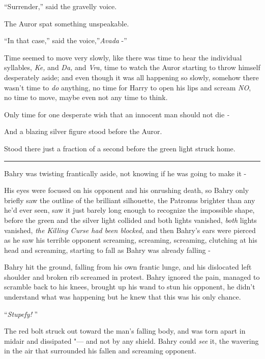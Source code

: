 ``Surrender,'' said the gravelly voice.

The Auror spat something unspeakable.

``In that case,'' said the voice,''\emph{Avada} -''

Time seemed to move very slowly, like there was time to hear the
individual syllables, \emph{Ke,} and \emph{Da,} and \emph{Vra,} time to
watch the Auror starting to throw himself desperately aside; and even
though it was all happening so slowly, somehow there wasn't time to
\emph{do} anything, no time for Harry to open his lips and scream
\emph{NO}, no time to move, maybe even not any time to think.

Only time for one desperate wish that an innocent man should not die
\emph{-}

And a blazing silver figure stood before the Auror.

Stood there just a fraction of a second before the green light struck
home.

\begin{center}\rule{3in}{0.4pt}\end{center}

Bahry was twisting frantically aside, not knowing if he was going to
make it -

His eyes were focused on his opponent and his onrushing death, so Bahry
only briefly saw the outline of the brilliant silhouette, the Patronus
brighter than any he'd ever seen, saw it just barely long enough to
recognize the impossible shape, before the green and the silver light
collided and both lights vanished, \emph{both} lights vanished,
\emph{the Killing Curse had been blocked}, and then Bahry's ears were
pierced as he saw his terrible opponent screaming, screaming, screaming,
clutching at his head and screaming, starting to fall as Bahry was
already falling -

Bahry hit the ground, falling from his own frantic lunge, and his
dislocated left shoulder and broken rib screamed in protest. Bahry
ignored the pain, managed to scramble back to his knees, brought up his
wand to stun his opponent, he didn't understand what was happening but
he knew that this was his only chance.

``\emph{Stupefy!} ''

The red bolt struck out toward the man's falling body, and was torn
apart in midair and dissipated "--- and not by any shield. Bahry could
\emph{see} it, the wavering in the air that surrounded his fallen and
screaming opponent.

